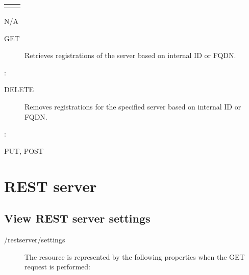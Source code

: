 \documentclass[letterpaper,10pt,english]{sphinxmanual}
\begin{document}
\begin{savenotes}\sphinxattablestart
\centering
\begin{tabulary}{\linewidth}[t]{|T|T|}
\hline

&
\\
\hline&\\
\hline
\end{tabulary}
\par
\sphinxattableend\end{savenotes}

 N/A
\begin{description}
\item[{ GET}] \leavevmode
Retrieves registrations of the server based on internal ID or FQDN.

\end{description}

:

\begin{sphinxVerbatim}[commandchars=\\\{\}]
\end{sphinxVerbatim}
\begin{description}
\item[{ DELETE}] \leavevmode
Removes registrations for the specified server based on internal ID or FQDN.

\end{description}

:

\begin{sphinxVerbatim}[commandchars=\\\{\}]
\end{sphinxVerbatim}

 PUT, POST


\section{REST server}
\label{\detokenize{restapi:rest-server}}

\subsection{View REST server settings}
\label{\detokenize{restapi:view-rest-server-settings}}
 /restserver/settings
\begin{description}
\item[{}] \leavevmode
The resource is represented by the following properties when the GET request is performed:

\end{description}
\end{document}
